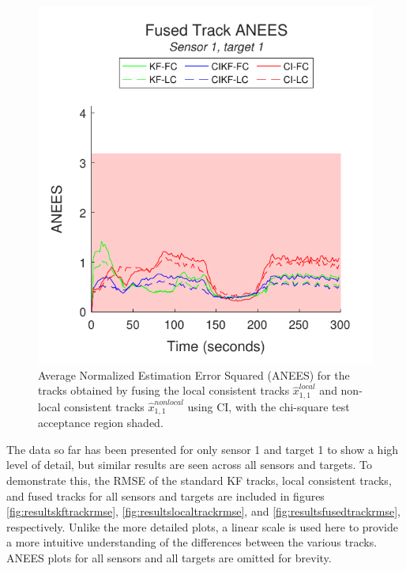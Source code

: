\documentclass[journal]{IEEEtran}
\begin{document}
\begin{figure}[ht]
    \centering
    \includegraphics[scale=0.85]{fusedtrack_anees_s1t1.pdf}
    \caption{Average Normalized Estimation Error Squared (ANEES) for the tracks obtained by fusing the local consistent tracks $\hat{x}_{1,1}^{local}$ and non-local consistent tracks $\hat{x}_{1,1}^{nonlocal}$ using CI, with the chi-square test acceptance region shaded.}
    \label{fig:resultsfusedtrackaneess1t1}
\end{figure}

The data so far has been presented for only sensor 1 and target 1 to show a high level of detail, but similar results are seen across all sensors and targets. To demonstrate this, the RMSE of the standard KF tracks, local consistent tracks, and fused tracks for all sensors and targets are included in figures \ref{fig:resultskftrackrmse}, \ref{fig:resultslocaltrackrmse}, and \ref{fig:resultsfusedtrackrmse}, respectively. Unlike the more detailed plots, a linear scale is used here to provide a more intuitive understanding of the differences between the various tracks. ANEES plots for all sensors and all targets are omitted for brevity.
\end{document}
